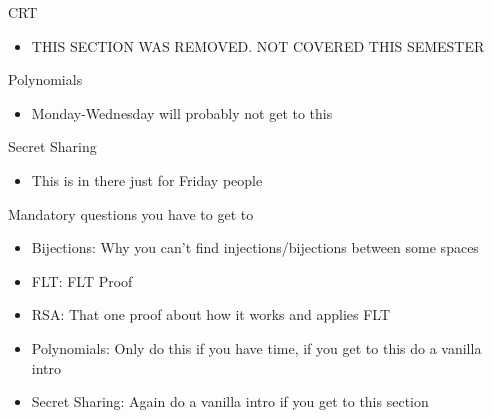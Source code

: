 \documentclass{exam}
\begin{document}
\begin{questions}
\item CRT
\begin{itemize}
\item THIS SECTION WAS REMOVED. NOT COVERED THIS SEMESTER
\end{itemize}

\item Polynomials
\begin{itemize}
\item Monday-Wednesday will probably not get to this
\end{itemize}

\item Secret Sharing
\begin{itemize}
\item This is in there just for Friday people
\end{itemize}
\item Mandatory questions you have to get to
\begin{itemize}
\item Bijections:  Why you can’t find injections/bijections between some spaces
\item FLT: FLT Proof
\item RSA: That one proof about how it works and applies FLT
\item Polynomials: Only do this if you have time, if you get to this do a vanilla intro
\item Secret Sharing: Again do a vanilla intro if you get to this section
\end{itemize}

\end{questions}
\end{document}
